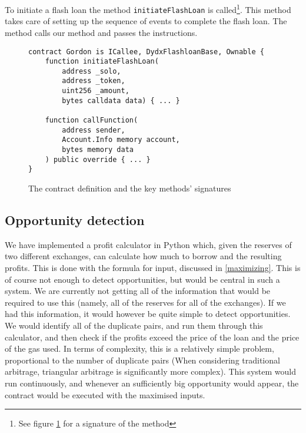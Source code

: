 \noindent To initiate a flash loan the method \verb|initiateFlashLoan| is
called\footnote{See figure \ref{signature} for a signature of the method}. This
method takes care of setting up the sequence of events to complete the flash
loan. The method calls our  method and passes the
instructions.

\begin{figure}[H]
\begin{lstlisting}[language=Solidity,numbers=none]
contract Gordon is ICallee, DydxFlashloanBase, Ownable {
    function initiateFlashLoan(
        address _solo,
        address _token,
        uint256 _amount,
        bytes calldata data) { ... }

    function callFunction(
        address sender,
        Account.Info memory account,
        bytes memory data
    ) public override { ... }
}
\end{lstlisting}
    \caption{The contract definition and the key methods' signatures}
    \label{signature}
\end{figure}

\subsection{Opportunity detection}
We have implemented a profit calculator in Python which, given the reserves of
two different exchanges, can calculate how much to borrow and the resulting
profits. This is done with the formula for input, discussed in
\autoref{maximizing}. This is of course not enough to detect opportunities, but
would be central in such a system. We are currently not getting all of the
information that would be required to use this (namely, all of the reserves for
all of the exchanges). If we had this information, it would however be quite
simple to detect opportunities. We would identify all of the duplicate pairs,
and run them through this calculator, and then check if the profits exceed the
price of the loan and the price of the gas used. In terms of complexity, this is
a relatively simple problem, proportional to the number of duplicate pairs (When
considering traditional arbitrage, triangular arbitrage is significantly more
complex). This system would run continuously, and whenever an sufficiently big
opportunity would appear, the contract would be executed with the maximised
inputs.
